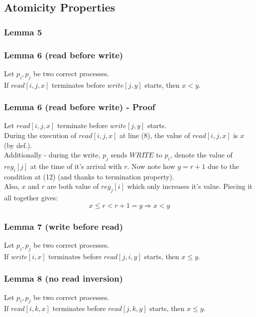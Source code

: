 \subsection{Atomicity Properties}
\begin{frame}
    \frametitle{Lemma 5}
\end{frame}
\begin{frame}
    \frametitle{Lemma 6 (read before write)}
    \begin{lemma}
        Let $p_i, p_j$ be two correct processes.\\
        If $read[i,j,x]$ terminates before $write[j,y]$ starts, then $x<y$.
    \end{lemma}
\end{frame}
\begin{frame}
    \frametitle{Lemma 6 (read before write) - Proof}
        Let $read[i,j,x]$ terminate before $write[j,y]$ starts.\\
        During the execution of $read[i,j,x]$ at line (8), the value of $read[i,j,x]$
        is $x$ (by def.).\\
        Additionally - during the write, $p_j$ sends $WRITE$ to
        $p_i$, denote the value of $reg_i[j]$ at the time of it's arrival
        with $r$. Now note how $y=r+1$ due to the condition at (12) (and thanks to termination property).\\
        Also, $x$ and $r$ are both value of $reg_j[i]$ which only increases it's value.
        Piecing it all together gives:
        \[
            x\leq r<r+1=y \Rightarrow x<y
        \]
\end{frame}
\begin{frame}
    \frametitle{Lemma 7 (write before read)}
    \begin{lemma}
        Let $p_i, p_j$ be two correct processes.\\
        If $write[i,x]$ terminates before $read[j,i,y]$ starts, then $x\leq y$.
    \end{lemma}
\end{frame}
\begin{frame}
    \frametitle{Lemma 8 (no read inversion)}
    \begin{lemma}
        Let $p_i, p_j$ be two correct processes.\\
        If $read[i,k,x]$ terminates before $read[j,k,y]$ starts, then $x\leq y$.
    \end{lemma}
\end{frame}

